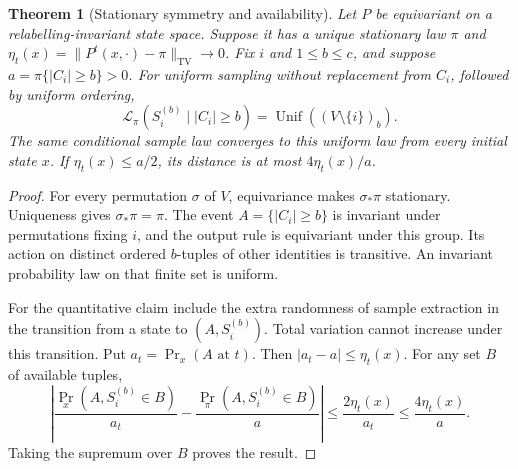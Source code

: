 \documentclass[11pt]{article}
\newtheorem{theorem}{Theorem}
\newcommand{\TV}{\mathrm{TV}}
\newcommand{\Unif}{\operatorname{Unif}}
\newcommand{\Law}{\mathcal L}
\begin{document}
\begin{theorem}[Stationary symmetry and availability]
\label{thm:stationary}
Let $P$ be equivariant on a relabelling-invariant state space.
Suppose it has a unique stationary law $\pi$ and
$\eta_t(x)=\|P^t(x,\cdot)-\pi\|_{\TV}\to0$.
Fix $i$ and $1\le b\le c$, and suppose
$a=\pi\{|C_i|\ge b\}>0$. For uniform sampling without replacement
from $C_i$, followed by uniform ordering,
\[
 \Law_\pi(S_i^{(b)}\mid |C_i|\ge b)
 =\Unif((V\setminus\{i\})_b).
\]
The same conditional sample law converges to this uniform law from
every initial state $x$. If $\eta_t(x)\le a/2$, its distance is at most
$4\eta_t(x)/a$.
\end{theorem}
\begin{proof}
For every permutation $\sigma$ of $V$, equivariance makes
$\sigma_*\pi$ stationary. Uniqueness gives $\sigma_*\pi=\pi$.
The event $A=\{|C_i|\ge b\}$ is invariant under permutations fixing
$i$, and the output rule is equivariant under this group. Its action
on distinct ordered $b$-tuples of other identities is transitive.
An invariant probability law on that finite set is uniform.

For the quantitative claim include the extra randomness of sample
extraction in the transition from a state to $(A,S_i^{(b)})$.
Total variation cannot increase under this transition. Put
$a_t=\Pr_x(A\text{ at }t)$. Then $|a_t-a|\le\eta_t(x)$.
For any set $B$ of available tuples,
\[
 \left|\frac{\Pr_x(A,S_i^{(b)}\in B)}{a_t}
       -\frac{\Pr_\pi(A,S_i^{(b)}\in B)}a\right|
 \le\frac{2\eta_t(x)}{a_t}
 \le\frac{4\eta_t(x)}a .
\]
Taking the supremum over $B$ proves the result.
\end{proof}
\end{document}
